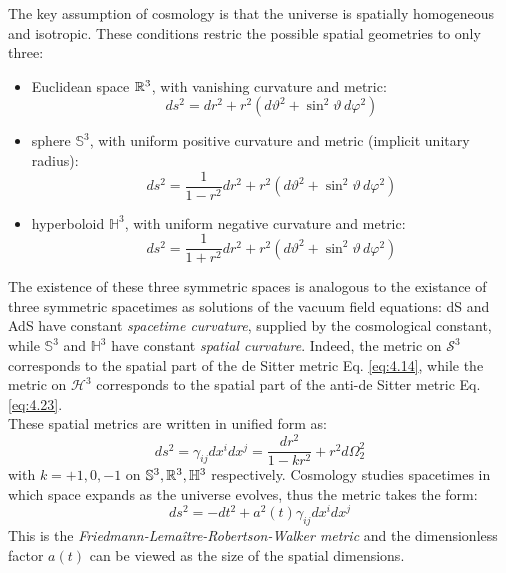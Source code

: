 The key assumption of cosmology is that the universe is spatially homogeneous and isotropic. These conditions restric the possible spatial geometries to only three:
\begin{itemize}
  \item Euclidean space $ \mathbb{R}^3 $, with vanishing curvature and metric:
    \begin{equation*}
      ds^2 = dr^2 + r^2 \left( d\vartheta^2 + \sin^2 \vartheta\, d\varphi^2 \right)
    \end{equation*}
  \item sphere $ \mathbb{S}^3 $, with uniform positive curvature and metric (implicit unitary radius):
    \begin{equation*}
      ds^2 = \frac{1}{1 - r^2} dr^2 + r^2 \left( d\vartheta^2 + \sin^2 \vartheta\, d\varphi^2 \right)
    \end{equation*}
  \item hyperboloid $ \mathbb{H}^3 $, with uniform negative curvature and metric:
    \begin{equation*}
      ds^2 = \frac{1}{1 + r^2} dr^2 + r^2 \left( d\vartheta^2 + \sin^2 \vartheta\, d\varphi^2 \right)
    \end{equation*}
\end{itemize}
The existence of these three symmetric spaces is analogous to the existance of three symmetric spacetimes as solutions of the vacuum field equations: dS and AdS have constant \textit{spacetime curvature}, supplied by the cosmological constant, while $ \mathbb{S}^3 $ and $ \mathbb{H}^3 $ have constant \textit{spatial curvature}. Indeed, the metric on $ \mathcal{S}^3 $ corresponds to the spatial part of the de Sitter metric Eq. \ref{eq:4.14}, while the metric on $ \mathcal{H}^3 $ corresponds to the spatial part of the anti-de Sitter metric Eq. \ref{eq:4.23}.\\
These spatial metrics are written in unified form as:
\begin{equation}
  ds^2 = \gamma_{ij} dx^i dx^j = \frac{dr^2}{1 - kr^2} + r^2 d\Omega_2^2
  \label{eq:4.56}
\end{equation}
with $ k = +1,0,-1 $ on $ \mathbb{S}^3, \mathbb{R}^3, \mathbb{H}^3 $ respectively. Cosmology studies spacetimes in which space expands as the universe evolves, thus the metric takes the form:
\begin{equation}
  ds^2 = - dt^2 + a^2(t) \gamma_{ij} dx^i dx^j
  \label{eq:4.57}
\end{equation}
This is the \textit{Friedmann-Lemaître-Robertson-Walker metric} and the dimensionless factor $ a(t) $ can be viewed as the size of the spatial dimensions.

